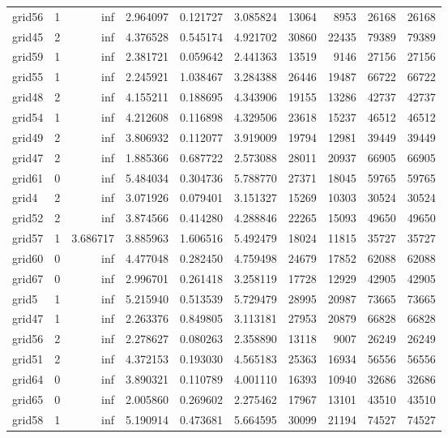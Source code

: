 \begin{longtable}{|l|r|r|r|r|r|r|r|r|r|}
grid56 & 1 & inf & 2.964097 & 0.121727 & 3.085824 & 13064 & 8953 & 26168 & 26168 \\
grid45 & 2 & inf & 4.376528 & 0.545174 & 4.921702 & 30860 & 22435 & 79389 & 79389 \\
grid59 & 1 & inf & 2.381721 & 0.059642 & 2.441363 & 13519 & 9146 & 27156 & 27156 \\
grid55 & 1 & inf & 2.245921 & 1.038467 & 3.284388 & 26446 & 19487 & 66722 & 66722 \\
grid48 & 2 & inf & 4.155211 & 0.188695 & 4.343906 & 19155 & 13286 & 42737 & 42737 \\
grid54 & 1 & inf & 4.212608 & 0.116898 & 4.329506 & 23618 & 15237 & 46512 & 46512 \\
grid49 & 2 & inf & 3.806932 & 0.112077 & 3.919009 & 19794 & 12981 & 39449 & 39449 \\
grid47 & 2 & inf & 1.885366 & 0.687722 & 2.573088 & 28011 & 20937 & 66905 & 66905 \\
grid61 & 0 & inf & 5.484034 & 0.304736 & 5.788770 & 27371 & 18045 & 59765 & 59765 \\
grid4 & 2 & inf & 3.071926 & 0.079401 & 3.151327 & 15269 & 10303 & 30524 & 30524 \\
grid52 & 2 & inf & 3.874566 & 0.414280 & 4.288846 & 22265 & 15093 & 49650 & 49650 \\
grid57 & 1 & 3.686717 & 3.885963 & 1.606516 & 5.492479 & 18024 & 11815 & 35727 & 35727 \\
grid60 & 0 & inf & 4.477048 & 0.282450 & 4.759498 & 24679 & 17852 & 62088 & 62088 \\
grid67 & 0 & inf & 2.996701 & 0.261418 & 3.258119 & 17728 & 12929 & 42905 & 42905 \\
grid5 & 1 & inf & 5.215940 & 0.513539 & 5.729479 & 28995 & 20987 & 73665 & 73665 \\
grid47 & 1 & inf & 2.263376 & 0.849805 & 3.113181 & 27953 & 20879 & 66828 & 66828 \\
grid56 & 2 & inf & 2.278627 & 0.080263 & 2.358890 & 13118 & 9007 & 26249 & 26249 \\
grid51 & 2 & inf & 4.372153 & 0.193030 & 4.565183 & 25363 & 16934 & 56556 & 56556 \\
grid64 & 0 & inf & 3.890321 & 0.110789 & 4.001110 & 16393 & 10940 & 32686 & 32686 \\
grid65 & 0 & inf & 2.005860 & 0.269602 & 2.275462 & 17967 & 13101 & 43510 & 43510 \\
grid58 & 1 & inf & 5.190914 & 0.473681 & 5.664595 & 30099 & 21194 & 74527 & 74527 \\

\end{longtable}

